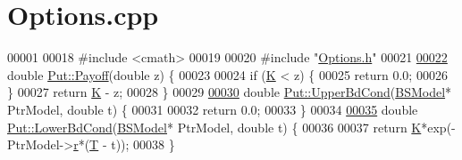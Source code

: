 \hypertarget{Options_8cpp_source}{\section{Options.\+cpp}
}

\begin{DoxyCode}
00001 
00018 \textcolor{preprocessor}{#include <cmath>}
00019 
00020 \textcolor{preprocessor}{#include "\hyperlink{Options_8h}{Options.h}"}
00021 
\hypertarget{Options_8cpp_source_l00022}{}\hyperlink{classPut_ae2bbadeb2c9f05644ef9b9af97ad7520}{00022} \textcolor{keywordtype}{double} \hyperlink{classPut_ae2bbadeb2c9f05644ef9b9af97ad7520}{Put::Payoff}(\textcolor{keywordtype}{double} z) \{
00023 
00024   \textcolor{keywordflow}{if} (\hyperlink{classPut_aa8d5c1c7465fd311ddaf33533038f959}{K} < z) \{
00025     \textcolor{keywordflow}{return} 0.0;
00026   \}
00027   \textcolor{keywordflow}{return} \hyperlink{classPut_aa8d5c1c7465fd311ddaf33533038f959}{K} - z;
00028 \}
00029 
\hypertarget{Options_8cpp_source_l00030}{}\hyperlink{classPut_ac15aea264781b4f426b68918ab73a27d}{00030} \textcolor{keywordtype}{double} \hyperlink{classPut_ac15aea264781b4f426b68918ab73a27d}{Put::UpperBdCond}(\hyperlink{classBSModel}{BSModel}* PtrModel, \textcolor{keywordtype}{double} t) \{
00031 
00032   \textcolor{keywordflow}{return} 0.0;
00033 \}
00034 
\hypertarget{Options_8cpp_source_l00035}{}\hyperlink{classPut_ab07d0f1d939f267861484f645d71c9c5}{00035} \textcolor{keywordtype}{double} \hyperlink{classPut_ab07d0f1d939f267861484f645d71c9c5}{Put::LowerBdCond}(\hyperlink{classBSModel}{BSModel}* PtrModel, \textcolor{keywordtype}{double} t) \{
00036 
00037   \textcolor{keywordflow}{return} \hyperlink{classPut_aa8d5c1c7465fd311ddaf33533038f959}{K}*exp(-PtrModel->\hyperlink{classBSModel_add3230c0df8e47623116b439598c0de3}{r}*(\hyperlink{classOption_ae583dd6d430a3b428014efa942605d54}{T} - t));
00038 \}
\end{DoxyCode}
